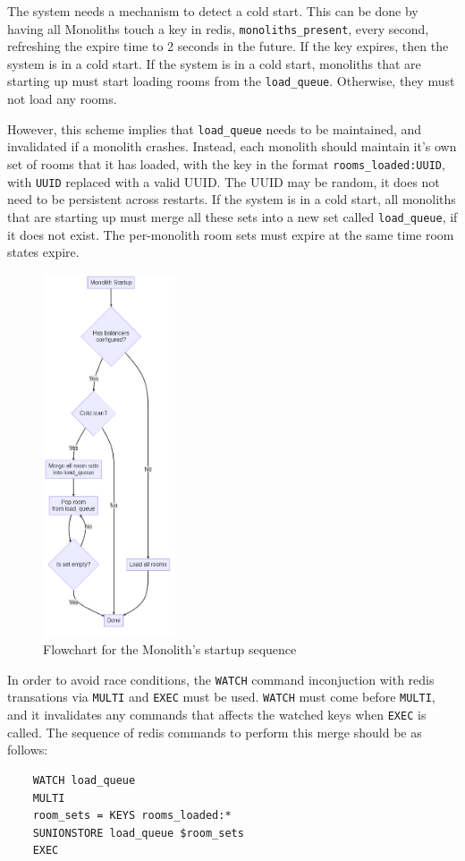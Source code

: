 The system needs a mechanism to detect a cold start. This can be done by having all Monoliths touch a key in redis, \texttt{monoliths\_present}, every second, refreshing the expire time to 2 seconds in the future. If the key expires, then the system is in a cold start. If the system is in a cold start, monoliths that are starting up must start loading rooms from the \texttt{load\_queue}. Otherwise, they must not load any rooms.

However, this scheme implies that \texttt{load\_queue} needs to be maintained, and invalidated if a monolith crashes. Instead, each monolith should maintain it's own set of rooms that it has loaded, with the key in the format \texttt{rooms\_loaded:UUID}, with \texttt{UUID} replaced with a valid UUID. The UUID may be random, it does not need to be persistent across restarts. If the system is in a cold start, all monoliths that are starting up must merge all these sets into a new set called \texttt{load\_queue}, if it does not exist. The per-monolith room sets must expire at the same time room states expire.

\begin{figure}[!h]
  \centering
  \includegraphics[width=0.35\textwidth]{Figures/monolith-startup.png}
  \caption{Flowchart for the Monolith's startup sequence}
  \label{Figure::monolith-startup}
\end{figure}

In order to avoid race conditions, the \texttt{WATCH} command inconjuction with redis transations via \texttt{MULTI} and \texttt{EXEC}\cite{redis-transactions} must be used. \texttt{WATCH} must come before \texttt{MULTI}, and it invalidates any commands that affects the watched keys when \texttt{EXEC} is called. The sequence of redis commands to perform this merge should be as follows:

\begin{verbatim}
	WATCH load_queue
	MULTI
	room_sets = KEYS rooms_loaded:*
	SUNIONSTORE load_queue $room_sets
	EXEC
\end{verbatim}